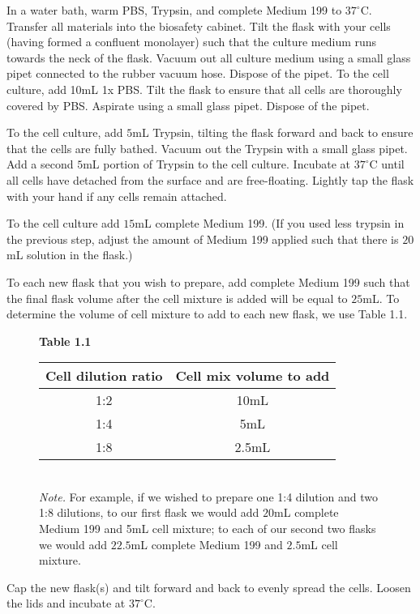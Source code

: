 In a water bath, warm PBS, Trypsin, and complete Medium 199 to $37^{\circ}$C. Transfer all materials into the biosafety cabinet. Tilt the flask with your cells (having formed a confluent monolayer) such that the culture medium runs towards the neck of the flask. Vacuum out all culture medium using a small glass pipet connected to the rubber vacuum hose. Dispose of the pipet. To the cell culture, add 10mL 1x PBS. Tilt the flask to ensure that all cells are thoroughly covered by PBS. Aspirate using a small glass pipet. Dispose of the pipet.

To the cell culture, add $5$mL Trypsin, tilting the flask forward and back to ensure that the cells are fully bathed. Vacuum out the Trypsin with a small glass pipet. Add a second $5$mL portion of Trypsin to the cell culture. Incubate at $37^{\circ}$C until all cells have detached from the surface and are free-floating. Lightly tap the flask with your hand if any cells remain attached.

To the cell culture add $15$mL complete Medium 199. (If you used less trypsin in the previous step, adjust the amount of Medium 199 applied such that there is $20$mL solution in the flask.)

To each new flask that you wish to prepare, add complete Medium 199 such that the final flask volume after the cell mixture is added will be equal to $25$mL. To determine the volume of cell mixture to add to each new flask, we use Table 1.1.

\begin{figure}[htp]
{\bfseries Table 1.1}\\[0.1cm]
\begin{tabular*}{\textwidth}{c c}
\hline
Cell dilution ratio & Cell mix volume to add \\
\hline
1:2 & 10mL \\
1:4 & 5mL \\
1:8 & 2.5mL \\
\hline
\end{tabular*}\\[0.1cm]
{\small {\itshape Note.} For example, if we wished to prepare one 1:4 dilution and two 1:8 dilutions, to our first flask we would add $20$mL complete Medium 199 and 5mL cell mixture; to each of our second two flasks we would add $22.5$mL complete Medium 199 and $2.5$mL cell mixture.}
\end{figure}

Cap the new flask(s) and tilt forward and back to evenly spread the cells. Loosen the lids and incubate at $37^{\circ}$C.


